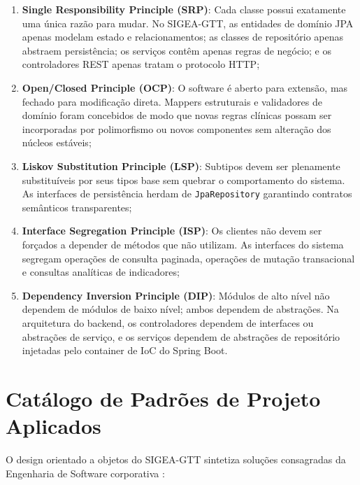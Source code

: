 \begin{enumerate}
    \item \textbf{Single Responsibility Principle (SRP)}: Cada classe possui exatamente uma única razão para mudar. No SIGEA-GTT, as entidades de domínio JPA apenas modelam estado e relacionamentos; as classes de repositório apenas abstraem persistência; os serviços contêm apenas regras de negócio; e os controladores REST apenas tratam o protocolo HTTP;
    \item \textbf{Open/Closed Principle (OCP)}: O software é aberto para extensão, mas fechado para modificação direta. Mappers estruturais e validadores de domínio foram concebidos de modo que novas regras clínicas possam ser incorporadas por polimorfismo ou novos componentes sem alteração dos núcleos estáveis;
    \item \textbf{Liskov Substitution Principle (LSP)}: Subtipos devem ser plenamente substituíveis por seus tipos base sem quebrar o comportamento do sistema. As interfaces de persistência herdam de \texttt{JpaRepository} garantindo contratos semânticos transparentes;
    \item \textbf{Interface Segregation Principle (ISP)}: Os clientes não devem ser forçados a depender de métodos que não utilizam. As interfaces do sistema segregam operações de consulta paginada, operações de mutação transacional e consultas analíticas de indicadores;
    \item \textbf{Dependency Inversion Principle (DIP)}: Módulos de alto nível não dependem de módulos de baixo nível; ambos dependem de abstrações. Na arquitetura do backend, os controladores dependem de interfaces ou abstrações de serviço, e os serviços dependem de abstrações de repositório injetadas pelo container de IoC do Spring Boot.
\end{enumerate}

\section{Catálogo de Padrões de Projeto Aplicados}
\label{sec_padroes_projeto}

O design orientado a objetos do SIGEA-GTT sintetiza soluções consagradas da Engenharia de Software corporativa \cite{gamma1994, fowler2002}:

